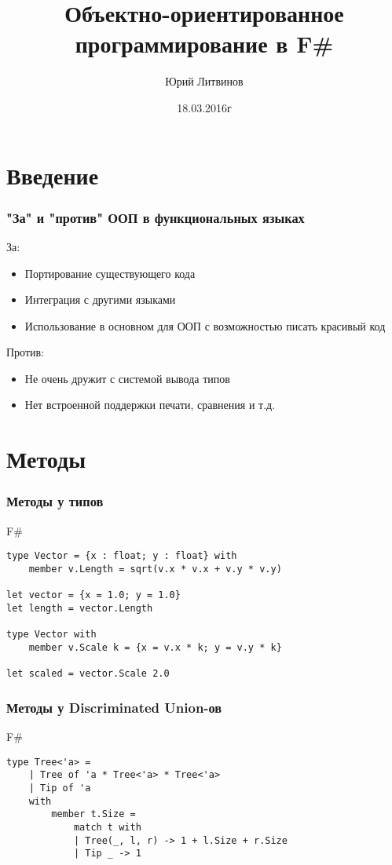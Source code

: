 \documentclass[xetex,mathserif,serif]{beamer}
\title{Объектно-ориентированное программирование в F\#}
\author{Юрий Литвинов}
\date{18.03.2016г}
\begin{document}
	
	\frame{\titlepage}
	
	\section{Введение}

	\begin{frame}
		\frametitle{"За" и "против" ООП в функциональных языках}
		За:
		\begin{itemize}
    		\item Портирование существующего кода
    		\item Интеграция с другими языками
    		\item Использование в основном для ООП с возможностью писать красивый код
		\end{itemize}
		
		Против:
		\begin{itemize}
    		\item Не очень дружит с системой вывода типов
    		\item Нет встроенной поддержки печати, сравнения и т.д.
		\end{itemize}
	\end{frame}
	
	\section{Методы}
	
	\begin{frame}[fragile]
		\frametitle{Методы у типов}
		\begin{exampleblock}{F\#}
			\begin{lstlisting}
type Vector = {x : float; y : float} with
    member v.Length = sqrt(v.x * v.x + v.y * v.y)
    
let vector = {x = 1.0; y = 1.0}
let length = vector.Length

type Vector with
    member v.Scale k = {x = v.x * k; y = v.y * k}

let scaled = vector.Scale 2.0
\end{lstlisting}
\end{exampleblock}
\end{frame}

	\begin{frame}[fragile]
		\frametitle{Методы у Discriminated Union-ов}
		\begin{exampleblock}{F\#}
			\begin{lstlisting}
type Tree<'a> =
    | Tree of 'a * Tree<'a> * Tree<'a>
    | Tip of 'a
    with
        member t.Size = 
            match t with
            | Tree(_, l, r) -> 1 + l.Size + r.Size
            | Tip _ -> 1
\end{lstlisting}
\end{exampleblock}
\end{frame}
\end{document}
